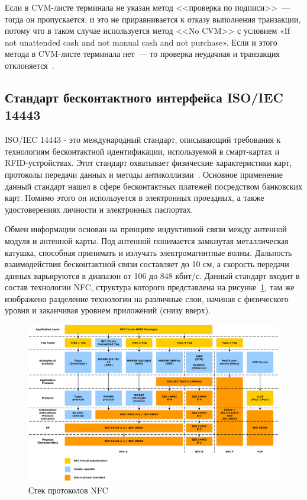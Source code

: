 Если в CVM-листе терминала не указан метод <<проверка по подписи>>~--- тогда он пропускается, и это не приравнивается к отказу выполнения транзакции, потому что в таком случае используется метод <<No CVM>> с условием «If not unattended cash and not manual cash and not purchase».
Если и этого метода в CVM-листе терминала нет~--– то проверка неудачная и транзакция отклоняется~\cite{habr_cvm}.


\subsection{Стандарт бесконтактного интерфейса ISO/IEC 14443}
\label{subsec:iso_14443}

ISO/IEC 14443 - это международный стандарт, описывающий требования к технологиям бесконтактной идентификации, используемой в смарт-картах и
RFID-устройствах. 
Этот стандарт охватывает физические характеристики карт, протоколы передачи данных и методы антиколлизии~\cite{iso_14443}.
Основное применение данный стандарт нашел в сфере бесконтактных платежей посредством банковских карт.
Помимо этого он используется в электронных проездных, а также удостоверениях личности и электронных паспортах.

Обмен информации основан на принципе индуктивной связи между антенной модуля и антенной карты.
Под антенной понимается замкнутая металлическая катушка, способная принимать и излучать электромагнитные волны.
Дальность взаимодействия бесконтактной связи составляет до 10 см, а скорость передачи данных варьируются в диапазон от 106 до 848 кбит/с.
Данный стандарт входит в состав технологии NFC, структура которого представлена на рисунке~\ref{fig:nfc_tech}, там же изображено разделение технологии на различные слои, начиная с физического уровня и заканчивая уровнем приложений (снизу вверх).

\begin{figure}[H]
    \centering
    \includegraphics[width=1\textwidth]{images/research/nfc_tech}
    \caption{\centering Стек протоколов NFC}
    \label{fig:nfc_tech}
\end{figure}

